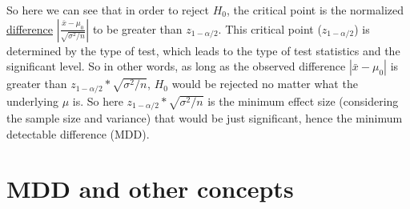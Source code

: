 \documentclass[a4paper,12pt]{article}
\begin{document}
So here we can see that in order to reject $H_0$, the critical point is the normalized \underline{difference} $\left|\frac{\bar{x} - \mu_0}{\sqrt{\sigma^2 / n}}\right|$ to be greater than $z_{1 - \alpha / 2}$. This critical point ($z_{1 - \alpha / 2}$) is determined by the type of test, which leads to the type of test statistics and the significant level. So in other words, as long as the observed difference $\left|\bar{x} - \mu_0\right|$ is greater than $z_{1 - \alpha / 2} * \sqrt{\sigma^2 / n}$, $H_0$ would be rejected no matter what the underlying $\mu$ is. So here $z_{1 - \alpha / 2} * \sqrt{\sigma^2 / n}$ is the minimum effect size (considering the sample size and variance) that would be just significant, hence the minimum detectable difference (MDD).

\section{MDD and other concepts}
\label{sec:mdd-other-concepts}






\end{document}
